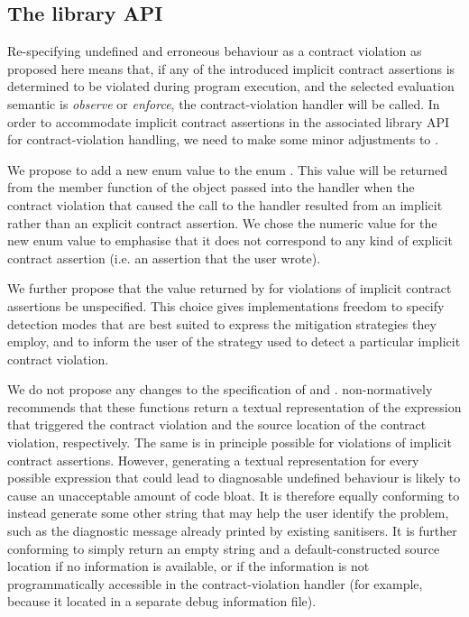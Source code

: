 \subsection{The library API}
\label{lib}

Re-specifying undefined and erroneous behaviour as a contract violation as proposed here means that, if any of the introduced implicit contract assertions is determined to be violated during program execution, and the selected evaluation semantic is \emph{observe} or \emph{enforce}, the contract-violation handler will be called. In order to accommodate implicit contract assertions in the associated library API for contract-violation handling, we need to make some minor adjustments to \cite{P2900R8}.

We propose to add a new enum value  to the enum . This value will be returned from the  member function of the  object passed into the handler when the contract violation that caused the call to the handler resulted from an implicit rather than an explicit contract assertion. We chose the numeric value  for the new enum value to emphasise that it does not correspond to any kind of explicit contract assertion (i.e. an assertion that the user wrote).

We further propose that the value returned by  for violations of implicit contract assertions be unspecified. This choice gives implementations freedom to specify detection modes that are best suited to express the mitigation strategies they employ, and to inform the user of the strategy used to detect a particular implicit contract violation. 

We do not propose any changes to the specification of  and . \cite{P2900R8} non-normatively recommends that these functions return a textual representation of the expression that triggered the contract violation and the source location of the contract violation, respectively. The same is in principle possible for violations of implicit contract assertions. However, generating a textual representation for every possible expression that could lead to diagnosable
undefined behaviour is likely to cause an unacceptable amount of code bloat. It is therefore equally conforming to instead generate some other string that may help the user identify the problem, such as the diagnostic message already printed by existing sanitisers. It is further conforming to simply return an empty string and a default-constructed source location if no information is available, or if the information is not programmatically accessible in the contract-violation handler (for example,
because it located in a separate debug information file). 

